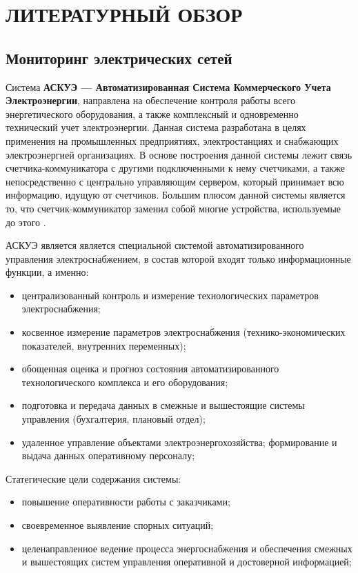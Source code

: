 \chapter{ЛИТЕРАТУРНЫЙ ОБЗОР}

\section{Мониторинг электрических сетей}

Система \textbf{АСКУЭ --- Автоматизированная Система Коммерческого Учета Электроэнергии}, направлена на обеспечение контроля работы всего энергетического оборудования, а также комплексный и одновременно технический учет электроэнергии. Данная система разработана в целях применения на промышленных предприятиях, электростанциях и снабжающих электроэнергией организациях. В основе построения данной системы лежит связь счетчика-коммуникатора с другими подключенными к нему счетчиками, а также непосредственно с центрально управляющим сервером, который принимает всю информацию, идущую от счетчиков. Большим плюсом данной системы является то, что счетчик-коммуникатор заменил собой многие устройства, используемые до этого \cite{ascaepinfo}.

АСКУЭ является является специальной системой автоматизированного управления электроснабжением, в состав которой входят только информационные функции, а именно:
\begin{itemize}
\item централизованный контроль и измерение технологических параметров электроснабжения;
\item косвенное измерение параметров электроснабжения (технико-экономических показателей, внутренних переменных);
\item обощенная оценка и прогноз состояния автоматизированного технологического комплекса и его оборудования;
\item подготовка и передача данных в смежные и вышестоящие системы управления (бухгалтерия, плановый отдел);
\item удаленное управление объектами электроэнергохозяйства; формирование и выдача
данных оперативному персоналу;
\end{itemize}

Статегические цели содержания системы:
\begin{itemize}
\item повышение оперативности работы с заказчиками;
\item своевременное выявление спорных ситуаций;
\item целенаправленное ведение процесса энергоснабжения и обеспечения смежных и вышестоящих систем управления оперативной и достоверной информацией;
\end{itemize}

